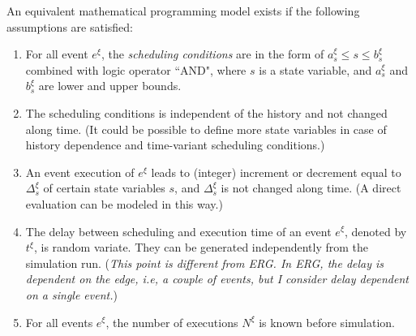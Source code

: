 \documentclass[]{interact}
\theoremstyle{plain}%
\theoremstyle{definition}
\theoremstyle{remark}
\begin{document}
An equivalent mathematical programming model exists if the following assumptions are satisfied:
\begin{enumerate}
	\item For all event $e^{\xi}$, the \textit{scheduling conditions} are in the form of $a^{\xi}_s\le s \le b^{\xi}_s$ combined with logic operator ``AND", where $s$ is a state variable, and $a^{\xi}_s$ and $b^{\xi}_s$ are lower and upper bounds.
	\item The scheduling conditions is independent of the history and not changed along time. (It could be possible to define more state variables in case of history dependence and time-variant scheduling conditions.)
	\item An event execution of $e^{\xi}$ leads to (integer) increment or decrement equal to $\Delta^{\xi}_s$ of certain state variables $s$, and $\Delta^{\xi}_s$ is not changed along time. (A direct evaluation can be modeled in this way.)
	\item The delay between scheduling and execution time of an event $e^{\xi}$, denoted by $t^{\xi}$, is random variate. They can be generated independently from the simulation run. (\textit{This point is different from ERG. In ERG, the delay is dependent on the edge, i.e, a couple of events, but I consider delay dependent on a single event.})
	\item For all events $e^{\xi}$, the number of executions $N^{\xi}$ is known before simulation.
\end{enumerate}
\end{document}
